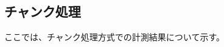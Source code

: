 \documentclass[../../../main]{subfiles}
\begin{document}
    \subsection{チャンク処理}\label{subsec:result-chunk}

    ここでは、チャンク処理方式での計測結果について示す。

    
    
%    
%
%    
\end{document}
